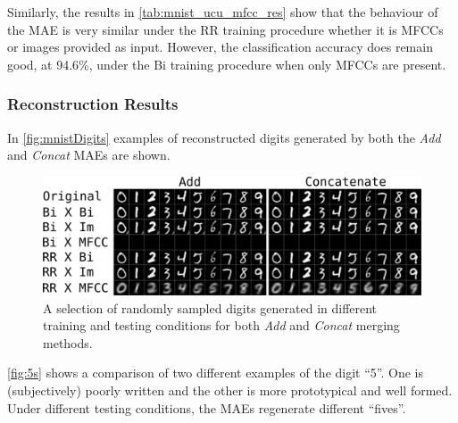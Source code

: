 Similarly, the results in \autoref{tab:mnist_ucu_mfcc_res} show that the behaviour of the \ac{MAE} is very similar under the RR training procedure whether it is \acp{MFCC} or images provided as input. However, the classification accuracy does remain good, at 94.6\%, under the Bi training procedure when only \acp{MFCC} are present. 

\subsubsection{Reconstruction Results}

In \autoref{fig:mnistDigits} examples of reconstructed digits generated by both the \textit{Add} and \textit{Concat} \acp{MAE} are shown.

\begin{figure}[h]
\begin{center}
	\includegraphics[width=\textwidth]{Figs/mnistSpoken/lbAll.png}
	\caption{A selection of randomly sampled digits generated in different training and testing conditions for both \textit{Add} and \textit{Concat} merging methods.}
	\label{fig:mnistDigits}
\end{center}
\end{figure}

\autoref{fig:5s} shows a comparison of two different examples of the digit ``5''. One is (subjectively) poorly written and the other is more prototypical and well formed. Under different testing conditions, the \acp{MAE} regenerate different ``fives''.

